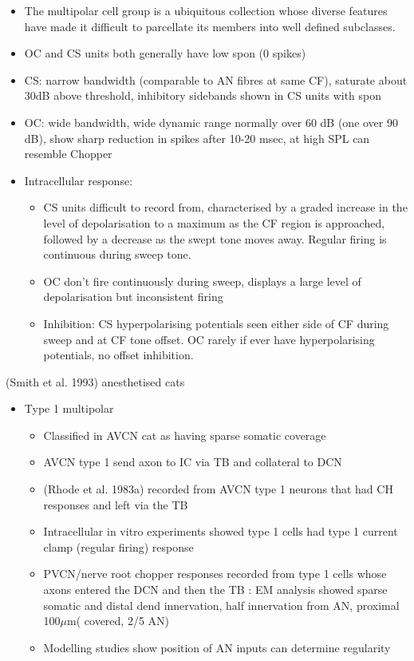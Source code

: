 \documentclass[10pt,a4paper]{article}
\newcommand{\um}{$\mu$m}
\begin{document}
\begin{itemize}
\item The multipolar cell group is a ubiquitous collection whose diverse
  features have made it difficult to parcellate its members into well defined
  subclasses.
\item OC and CS units both generally have low spon (0 spikes)
\item CS: narrow bandwidth (comparable to AN fibres at same CF), saturate about
  30dB above threshold, inhibitory sidebands shown in CS units with spon
\item OC: wide bandwidth, wide dynamic range normally over 60 dB (one over 90
  dB), show sharp reduction in spikes after 10-20 msec, at high SPL can resemble
  Chopper
\item Intracellular response:

  \begin{itemize}
  \item CS units difficult to record from, characterised by a graded increase in
    the level of depolarisation to a maximum as the CF region is approached,
    followed by a decrease as the swept tone moves away.  Regular firing is
    continuous during sweep tone.
  \item OC don{\textquoteright}t fire continuously during sweep, displays a
    large level of depolarisation but inconsistent firing
  \item Inhibition: CS hyperpolarising potentials seen either side of CF during
    sweep and at CF tone offset.  OC rarely if ever have hyperpolarising
    potentials, no offset inhibition.
  \end{itemize}
\end{itemize}
(Smith et al. 1993) anesthetised cats


\begin{itemize}
\item Type 1 multipolar

  \begin{itemize}
  \item Classified in AVCN cat as having sparse somatic coverage
    \citep{Cant:1981}
  \item AVCN type 1 send axon to IC \citep{Adams:1979,Cant:1982} via TB
    \citep{TolbertMorestEtAl:1982} and collateral to DCN \citep{Adams:1983b}
  \item (Rhode et al. 1983a) recorded from AVCN type 1 neurons that had CH
    responses and left via the TB
  \item Intracellular in vitro experiments showed type 1 cells had type 1
    current clamp (regular firing) response \citep{WuOertel:1984}
  \item PVCN/nerve root chopper responses recorded from type 1 cells whose axons
    entered the DCN and then the TB \citep{SmithRhode:1989}: EM analysis showed
    sparse somatic and distal dend innervation, half innervation from AN,
    proximal 100\um ( {\textonehalf} covered, 2/5 AN)
  \item Modelling studies show position of AN inputs can determine regularity
    \citep{BanksSachs:1991}
  \end{itemize}
\end{itemize}
\citep{OertelFujino:2001}
\end{document}
